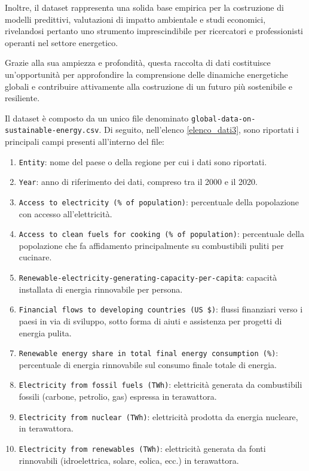 Inoltre, il dataset rappresenta una solida base empirica per la costruzione di modelli predittivi, valutazioni di impatto ambientale e studi economici, rivelandosi pertanto uno strumento imprescindibile per ricercatori e professionisti operanti nel settore energetico.

Grazie alla sua ampiezza e profondità, questa raccolta di dati costituisce un'opportunità per approfondire la comprensione delle dinamiche energetiche globali e contribuire attivamente alla costruzione di un futuro più sostenibile e resiliente.

Il dataset è composto da un unico file denominato \texttt{global-data-on-sustainable-energy.csv}. Di seguito, nell'elenco \ref{elenco_dati3}, sono riportati i principali campi presenti all'interno del file:
\vspace{2mm}
\begin{enumerate}
\label{elenco_dati3}
    \item \texttt{Entity}: nome del paese o della regione per cui i dati sono riportati.
    \item \texttt{Year}: anno di riferimento dei dati, compreso tra il 2000 e il 2020.
    \item \texttt{Access to electricity (\% of population)}: percentuale della popolazione con accesso all'elettricità.
    \item \texttt{Access to clean fuels for cooking (\% of population)}: percentuale della popolazione che fa affidamento principalmente su combustibili puliti per cucinare.
    \item \texttt{Renewable-electricity-generating-capacity-per-capita}: capacità installata di energia rinnovabile per persona.
    \item \texttt{Financial flows to developing countries (US \$)}: flussi finanziari verso i paesi in via di sviluppo, sotto forma di aiuti e assistenza per progetti di energia pulita.
    \item \texttt{Renewable energy share in total final energy consumption (\%)}: percentuale di energia rinnovabile sul consumo finale totale di energia.
    \item \texttt{Electricity from fossil fuels (TWh)}: elettricità generata da combustibili fossili (carbone, petrolio, gas) espressa in terawattora.
    \item \texttt{Electricity from nuclear (TWh)}: elettricità prodotta da energia nucleare, in terawattora.
    \item \texttt{Electricity from renewables (TWh)}: elettricità generata da fonti rinnovabili (idroelettrica, solare, eolica, ecc.) in terawattora.

\end{enumerate}
